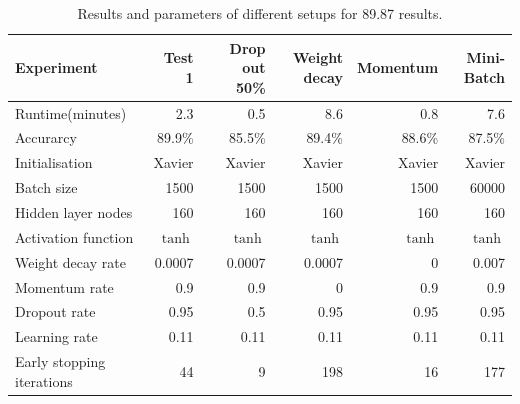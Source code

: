 \begin{table}
\caption{Results and parameters of different setups for 89.87 results.}
{\footnotesize \centering
\begin{tabular}{@{}lrrrrr@{}}
\toprule
Experiment                & Test 1  & Drop out 50\% & Weight decay & Momentum & Mini-Batch \\ \midrule
Runtime(minutes)          & 2.3     & 0.5        & 8.6          & 0.8      & 7.6           \\
Accurarcy                 & 89.9\%  & 85.5\%     & 89.4\%       & 88.6\%   & 87.5\%        \\
Initialisation            & Xavier  & Xavier     & Xavier       & Xavier   & Xavier        \\
Batch size                & 1500    & 1500       & 1500         & 1500     & 60000         \\
Hidden layer nodes        & 160     & 160        & 160          & 160      & 160           \\
Activation function       & $\tanh$ & $\tanh$    & $\tanh$      & $\tanh$  & $\tanh$       \\
Weight decay rate         & 0.0007  & 0.0007     & 0.0007       & 0        & 0.007         \\
Momentum rate             & 0.9     & 0.9        & 0            & 0.9      & 0.9           \\
Dropout rate              & 0.95    & 0.5        & 0.95         & 0.95     & 0.95          \\
Learning rate             & 0.11    & 0.11       & 0.11         & 0.11     & 0.11          \\
Early stopping iterations & 44      & 9          & 198          & 16       & 177           \\ \bottomrule
\end{tabular}
}
\end{table}


